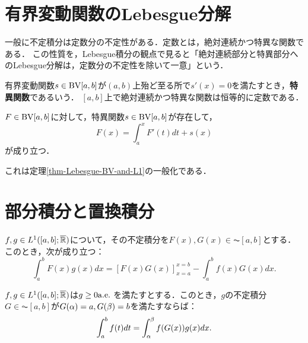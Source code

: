 \documentclass[uplatex, dvipdfmx]{jsreport}
\begin{document}
\section{有界変動関数のLebesgue分解}

\begin{tcolorbox}[colframe=ForestGreen, colback=ForestGreen!10!white,breakable,colbacktitle=ForestGreen!40!white,coltitle=black,fonttitle=\bfseries\sffamily,
title=]
    一般に不定積分は定数分の不定性がある．定数とは，絶対連続かつ特異な関数である．
    この性質を，Lebesgue積分の観点で見ると「絶対連続部分と特異部分へのLebesgue分解は，定数分の不定性を除いて一意」という．
\end{tcolorbox}

\begin{definition}
    有界変動関数$s\in\mathrm{BV}[a,b]$が$(a,b)$上殆ど至る所で$s'(x)=0$を満たすとき，\textbf{特異関数}であるいう．
    $[a,b]$上で絶対連続かつ特異な関数は恒等的に定数である．
\end{definition}

\begin{example}
    
\end{example}

\begin{corollary}
    $F\in\mathrm{BV}[a,b]$に対して，特異関数$s\in\mathrm{BV}[a,b]$が存在して，
    \[F(x)=\int^x_aF'(t)dt+s(x)\]
    が成り立つ．
\end{corollary}
\begin{remarks}
    これは定理\ref{thm-Lebesgue-BV-and-L1}の一般化である．
\end{remarks}

\section{部分積分と置換積分}

\begin{theorem}[部分積分]
    $f,g\in L^1([a,b];\overline{\mathbb{R}})$について，その不定積分を$F(x),G(x)\in\AC[a,b]$とする．
    このとき，次が成り立つ：
    \[\int^b_aF(x)g(x)dx=[F(x)G(x)]^{x=b}_{x=a}-\int^b_af(x)G(x)dx.\]
\end{theorem}

\begin{theorem}[置換積分]
    $f,g\in L^1([a,b];\overline{\mathbb{R}})$は$g\ge0\mathrm{a.e.}\;$を満たすとする．このとき，$g$の不定積分$G\in\AC[a,b]$が$G(\alpha)=a,G(\beta)=b$を満たすならば：
    \[\int^b_af(t)dt=\int^\beta_\alpha f(G(x))g(x)dx.\]
\end{theorem}
\end{document}
